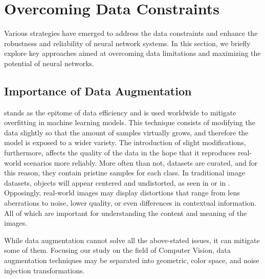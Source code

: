 \section{Overcoming Data Constraints}
Various strategies have emerged to address the data constraints and enhance the robustness and reliability of neural network systems. In this section, we briefly explore key approaches aimed at overcoming data limitations and maximizing the potential of neural networks.
\subsection{Importance of Data Augmentation} %
 stands as the epitome of data efficiency and is used worldwide to mitigate overfitting in machine learning models. This technique consists of modifying the data slightly so that the amount of samples virtually grows, and therefore the model is exposed to a wider variety. The introduction of slight modifications, furthermore, affects the quality of the data in the hope that it reproduces real-world scenarios more reliably. More often than not, datasets are curated, and for this reason, they contain pristine samples for each class. In traditional image datasets, objects will appear centered and undistorted, as seen in  or in . Opposingly, real-world images may display distortions that range from lens aberrations to noise, lower quality, or even differences in contextual information. All of which are important for understanding the content and meaning of the images.



While data augmentation cannot solve all the above-stated issues, it can mitigate some of them. Focusing our study on the field of Computer Vision, data augmentation techniques may be separated into geometric, color space, and noise injection transformations.

